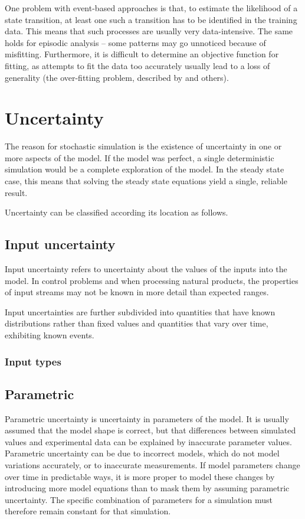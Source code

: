 One problem with event-based approaches is that, to estimate the
likelihood of a state transition, at least one such a transition has
to be identified in the training data.  This means that such processes
are usually very data-intensive.  The same holds for episodic analysis
-- some patterns may go unnoticed because of misfitting.
Furthermore, it is difficult to determine an objective function for
fitting, as attempts to fit the data too accurately usually
lead to a loss of generality (the over-fitting problem,
described by \citet{arora.khot2003fitting} and others).

\section{Uncertainty}
The reason for stochastic simulation is the existence of uncertainty in
one or more aspects of the model.  If the model was perfect, a single
deterministic simulation would be a complete exploration of the
model.  In the steady state case, this means that solving the steady
state equations yield a single, reliable result.  

Uncertainty can be classified according its location as follows.

\subsection{Input uncertainty}
Input uncertainty refers to uncertainty about the values of the inputs
into the model.  In control problems and when processing natural
products, the properties of input streams may not be known in more
detail than expected ranges.

Input uncertainties are further subdivided into quantities that have
known distributions rather than fixed values and quantities that vary
over time, exhibiting known events.

\subsubsection{Input types}

\subsection{Parametric}
Parametric uncertainty is uncertainty in parameters of the model.  It
is usually assumed that the model shape is correct, but that
differences between simulated values and experimental data can be
explained by inaccurate parameter values.  Parametric uncertainty can
be due to incorrect models, which do not model variations accurately,
or to inaccurate measurements.  If model parameters change over time
in predictable ways, it is more proper to model these changes by
introducing more model equations than to mask them by assuming
parametric uncertainty.  The specific combination of parameters for a
simulation must therefore remain constant for that simulation.

